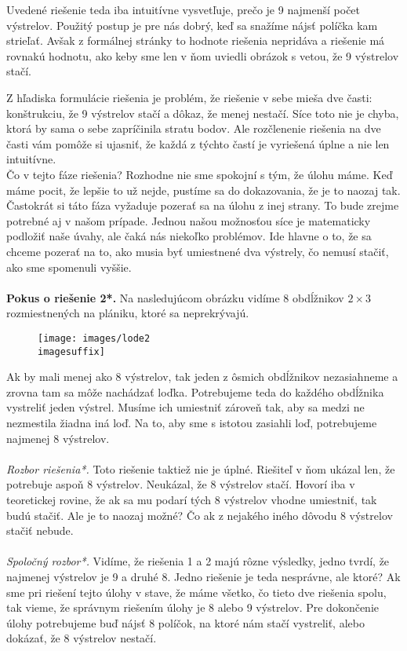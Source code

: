 {{Uvedené riešenie teda iba intuitívne vysvetľuje, prečo je 9 najmenší počet výstrelov. Použitý postup je pre nás dobrý, keď sa snažíme nájsť políčka kam strieľať. Avšak z formálnej stránky to hodnote riešenia nepridáva a riešenie má rovnakú hodnotu, ako keby sme len v ňom uviedli obrázok s vetou, že 9 výstrelov stačí.

Z hľadiska formulácie riešenia je problém, že riešenie v sebe mieša dve časti: konštrukciu, že 9 výstrelov stačí a dôkaz, že menej nestačí. Síce toto nie je chyba, ktorá by sama o sebe zapríčinila stratu bodov. Ale rozčlenenie riešenia na dve časti vám pomôže si ujasniť, že každá z týchto častí je vyriešená úplne a nie len intuitívne.\\

Čo v tejto fáze riešenia? Rozhodne nie sme spokojní s tým, že úlohu máme. Keď máme pocit, že lepšie to už nejde, pustíme sa do dokazovania, že je to naozaj tak. Častokrát si táto fáza vyžaduje pozerať sa na úlohu z inej strany. To bude zrejme potrebné aj v našom prípade. Jednou našou možnosťou síce je matematicky podložiť naše úvahy, ale čaká nás niekoľko problémov. Ide hlavne o to, že sa chceme pozerať na to, ako musia byť umiestnené dva výstrely, čo nemusí stačiť, ako sme spomenuli vyššie.\\
\\
\textbf{Pokus o riešenie 2*.} Na nasledujúcom obrázku vidíme 8 obdĺžnikov $2\times3$ rozmiestnených na plániku, ktoré sa neprekrývajú.

\begin{figure}[h]
    \centering
    \texttt{[image: images/lode2\\imagesuffix]}
    \caption{}
    \label{fig:lode2}
\end{figure}

Ak by mali menej ako 8 výstrelov, tak jeden z ôsmich obdĺžnikov nezasiahneme a zrovna tam sa môže nachádzať loďka. Potrebujeme teda do každého obdĺžnika vystreliť jeden výstrel. Musíme ich umiestniť zároveň tak, aby sa medzi ne nezmestila žiadna iná loď. Na to, aby sme s istotou zasiahli loď, potrebujeme najmenej 8 výstrelov.\\
\\
\textit{Rozbor riešenia*.} Toto riešenie taktiež nie je úplné. Riešiteľ v ňom ukázal len, že potrebuje aspoň 8 výstrelov. Neukázal, že 8 výstrelov stačí. Hovorí iba v teoretickej rovine, že ak sa mu podarí tých 8 výstrelov vhodne umiestniť, tak budú stačiť. Ale je to naozaj možné? Čo ak z nejakého iného dôvodu 8 výstrelov stačiť nebude.\\
\\
\textit{Spoločný rozbor*.} Vidíme, že riešenia 1 a 2 majú rôzne výsledky, jedno tvrdí, že najmenej výstrelov je 9 a druhé 8. Jedno riešenie je teda nesprávne, ale ktoré? Ak sme pri riešení tejto úlohy v stave, že máme všetko, čo tieto dve riešenia spolu, tak vieme, že správnym riešením úlohy je 8 alebo 9 výstrelov. Pre dokončenie úlohy potrebujeme buď nájsť 8 políčok, na ktoré nám stačí vystreliť, alebo dokázať, že 8 výstrelov nestačí.

}}
